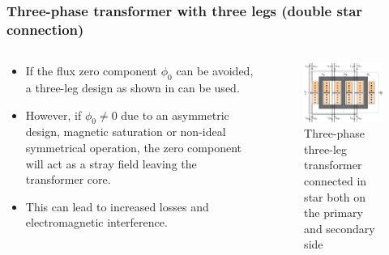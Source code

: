 \begin{frame}
	\frametitle{Three-phase transformer with three legs (double star connection)}
	\begin{columns}
		\begin{column}{0.4\textwidth}
           \begin{itemize}
				\item If the flux zero component $\phi_0$ can be avoided, a three-leg design as shown in  can be used.
				\item However, if $\phi_0 \neq 0$ due to an asymmetric design, magnetic saturation or non-ideal symmetrical operation, the zero component will act as a stray field leaving the transformer core.
				\item This can lead to increased losses and electromagnetic interference.
			\end{itemize}
		\end{column}
        \hfill
		\begin{column}{0.6\textwidth}
			\begin{figure}
				\includegraphics[height=0.7\textheight]{fig/lec04/Three_phase_transformer_3_legs_star.pdf}
				\caption{Three-phase three-leg transformer connected in star both on the primary and secondary side}
				\label{fig:Three_phase_transformer_3_legs_star}
			\end{figure}
		\end{column}
	\end{columns}
\end{frame}

